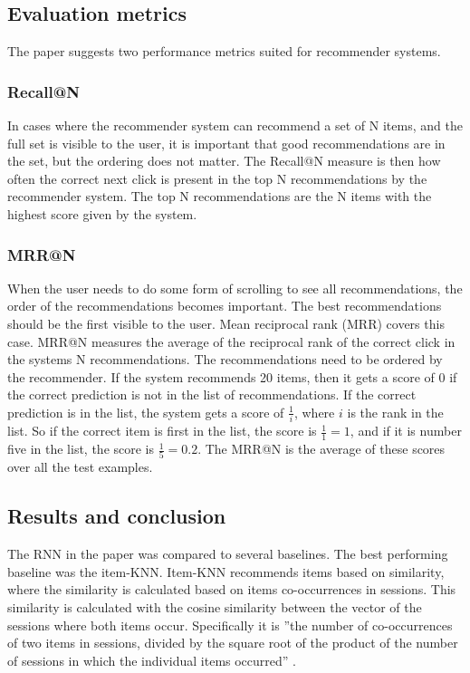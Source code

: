 \subsection{Evaluation metrics}
\label{sec:evaluation-metrics}
The paper suggests two performance metrics suited for recommender systems.

\subsubsection{Recall@N}
In cases where the recommender system can recommend a set of N items, and the full set is visible to the user, it is important that good recommendations are in the set, but the ordering does not matter. The Recall@N measure is then how often the correct next click is present in the top N recommendations by the recommender system. The top N recommendations are the N items with the highest score given by the system.

\subsubsection{MRR@N}
When the user needs to do some form of scrolling to see all recommendations, the order of the recommendations becomes important. The best recommendations should be the first visible to the user. Mean reciprocal rank (MRR) covers this case. MRR@N measures the average of the reciprocal rank of the correct click in the systems N recommendations. The recommendations need to be ordered by the recommender. If the system recommends 20 items, then it gets a score of 0 if the correct prediction is not in the list of recommendations. If the correct prediction is in the list, the system gets a score of $\frac{1}{i}$, where $i$ is the rank in the list. So if the correct item is first in the list, the score is $\frac{1}{1} = 1$, and if it is number five in the list, the score is $\frac{1}{5} = 0.2$. The MRR@N is the average of these scores over all the test examples.

\subsection{Results and conclusion}
The RNN in the paper was compared to several baselines. The best performing baseline was the item-KNN. Item-KNN recommends items based on similarity, where the similarity is calculated based on items co-occurrences in sessions. This similarity is calculated with the cosine similarity between the vector of the sessions where both items occur. Specifically it is ''the number of co-occurrences of two items in sessions, divided by the square root of the product of the number of sessions in which the individual items occurred'' \cite{DBLP:journals/corr/HidasiKBT15}.

